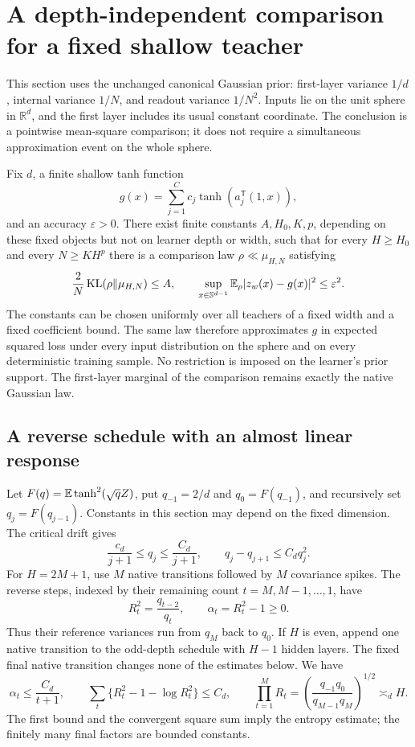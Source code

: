 \section{A depth-independent comparison for a fixed shallow teacher}
\label{sec:continuous-echo}
This section uses the unchanged canonical Gaussian prior: first-layer variance $1/d$, internal variance $1/N$, and readout variance $1/N^2$. Inputs lie on the unit sphere in $\mathbb R^d$, and the first layer includes its usual constant coordinate. The conclusion is a pointwise mean-square comparison; it does not require a simultaneous approximation event on the whole sphere.

\begin{theorem}
\label{thm:continuous-echo}
Fix $d$, a finite shallow tanh function
\[
 g(x)=\sum_{j=1}^C c_j\tanh(a_j^{\mathsf T}(1,x)),
\]
and an accuracy $\varepsilon>0$. There exist finite constants $A,H_0,K,p$, depending on these fixed objects but not on learner depth or width, such that for every $H\ge H_0$ and every $N\ge K H^p$ there is a comparison law $\rho\ll\mu_{H,N}$ satisfying
\[
 \frac2N\operatorname{KL}(\rho\|\mu_{H,N})\le A,
 \qquad
 \sup_{x\in\mathbb S^{d-1}}\mathbb E_\rho|z_w(x)-g(x)|^2\le\varepsilon^2.
\]
The constants can be chosen uniformly over all teachers of a fixed width and a fixed coefficient bound. The same law therefore approximates $g$ in expected squared loss under every input distribution on the sphere and on every deterministic training sample. No restriction is imposed on the learner's prior support. The first-layer marginal of the comparison remains exactly the native Gaussian law.
\end{theorem}

\subsection{A reverse schedule with an almost linear response}
Let $F(q)=\mathbb E\tanh^2(\sqrt q Z)$, put $q_{-1}=2/d$ and $q_0=F(q_{-1})$, and recursively set $q_j=F(q_{j-1})$. Constants in this section may depend on the fixed dimension. The critical drift gives
\[
 \frac{c_d}{j+1}\le q_j\le\frac{C_d}{j+1},\qquad
 q_j-q_{j+1}\le C_dq_j^2.
\]
For $H=2M+1$, use $M$ native transitions followed by $M$ covariance spikes. The reverse steps, indexed by their remaining count $t=M,M-1,\ldots,1$, have
\[
 R_t^2=\frac{q_{t-2}}{q_t},\qquad \alpha_t=R_t^2-1\ge0.
\]
Thus their reference variances run from $q_M$ back to $q_0$. If $H$ is even, append one native transition to the odd-depth schedule with $H-1$ hidden layers. The fixed final native transition changes none of the estimates below. We have
\[
 \alpha_t\le\frac{C_d}{t+1},\qquad
 \sum_t\{R_t^2-1-\log R_t^2\}\le C_d,
 \qquad
 \prod_{t=1}^M R_t
 =\left(\frac{q_{-1}q_0}{q_{M-1}q_M}\right)^{1/2}
 \asymp_d H.
\]
The first bound and the convergent square sum imply the entropy estimate; the finitely many final factors are bounded constants.

